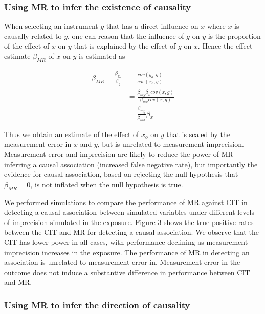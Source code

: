 \documentclass[]{article}
\begin{document}
\subsubsection{Using MR to infer the existence of
causality}\label{using-mr-to-infer-the-existence-of-causality}

When selecting an instrument \(g\) that has a direct influence on \(x\)
where \(x\) is causally related to \(y\), one can reason that the
influence of \(g\) on \(y\) is the proportion of the effect of \(x\) on
\(y\) that is explained by the effect of \(g\) on \(x\). Hence the
effect estimate \(\beta_{MR}\) of \(x\) on \(y\) is estimated as

\[
\begin{aligned}
\beta_{MR} = \frac{\beta_{y_o}}{\beta_g} & = \frac{cov(y_o, g)}{cov(x_o, g)} \\
                                         & = \frac{\beta_{my} \beta_x cov(x, g)} {\beta_{mx} cov(x, g)} \\
                                         & = \frac{\beta_{my}} {\beta_{mx}} \beta_x
\end{aligned}
\]

Thus we obtain an estimate of the effect of \(x_o\) on \(y\) that is
scaled by the measurement error in \(x\) and \(y\), but is unrelated to
measurement imprecision. Measurement error and imprecision are likely to
reduce the power of MR inferring a causal association (increased false
negative rate), but importantly the evidence for causal association,
based on rejecting the null hypothesis that \(\beta_{MR} = 0\), is not
inflated when the null hypothesis is true.

We performed simulations to compare the performance of MR against CIT in
detecting a causal association between simulated variables under
different levels of imprecision simulated in the exposure. Figure 3
shows the true positive rates between the CIT and MR for detecting a
causal association. We observe that the CIT has lower power in all
cases, with performance declining as measurement imprecision increases
in the exposure. The performance of MR in detecting an association is
unrelated to measurement error in. Measurement error in the outcome does
not induce a substantive difference in performance between CIT and MR.

\subsubsection{Using MR to infer the direction of
causality}\label{using-mr-to-infer-the-direction-of-causality}
\end{document}
